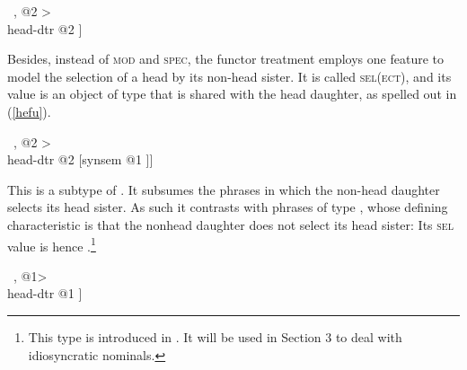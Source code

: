 \documentclass[output=paper
                ,modfonts
                ,nonflat
	        ,collection
	        ,collectionchapter
	        ,collectiontoclongg
 	        ,biblatex
                ,babelshorthands
                ,newtxmath
                ,draftmode
                ,colorlinks, citecolor=brown
]{./langsci/langscibook}
\begin{document}
\begin{exe}
\ex\label{mark1} 
\begin{avm}
\end{avm}
\ex\label{mark2} 
\begin{avm}
[\type{head-nonarg-phr}                    \\
 synsem|loc|cat|mark @1 \type{marking}   \\
 dtrs <[synsem|loc|cat|mark @1] ~, @2 > \\
 head-dtr @2 ]
\end{avm}
\end{exe}

\noindent
Besides, instead of \textsc{mod} and \textsc{spec}, the functor treatment employs 
one feature to model the selection of a head by its non-head sister. It is   
called \textsc{sel(ect)}, and its value is an object of type  that is 
shared with the head daughter, as spelled out in (\ref{hefu}).  

\begin{exe}
\ex\label{hefu} 
\begin{avm}
[\type{head-functor-phr}                     \\
 dtrs <[synsem|loc|cat|head|sel @1]~, @2 > \\
 head-dtr @2 [synsem @1 ]]
\end{avm}
\end{exe} 

\noindent
This is a subtype of . It subsumes 
the phrases in which the non-head daughter selects its head sister.
As such it contrasts with phrases of type  
, whose defining characteristic is 
that the nonhead daughter does not select its head sister: Its \textsc{sel} value 
is hence .\footnote{This type is introduced in 
\citet[130]{VanEynde98a}. It will be used in Section 3 to deal with 
idiosyncratic nominals.}   

\begin{exe}
\ex\label{hein} 
\begin{avm}
[\type{head-independent-phr}                           \\
 dtrs <[synsem|loc|cat|head|sel \type{none}]~, @1> \\
 head-dtr @1 ]
\end{avm}
\end{exe}    
\end{document}
